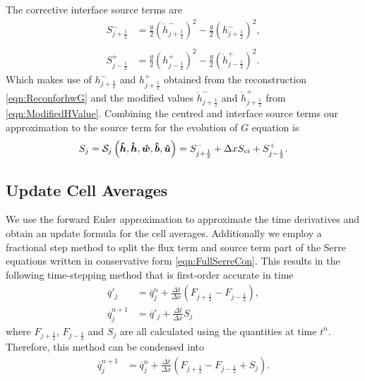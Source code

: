 The corrective interface source terms are
	\begin{align*}
	 S^{-}_{j + \frac{1}{2}} &=  \frac{g}{2} \left(\grave{h}^{-}_{j + \frac{1}{2}} \right)^2 - \frac{g}{2} \left(h^{-}_{j + \frac{1}{2}} \right)^2, \\ \\
	  S^{+}_{j - \frac{1}{2}} &=  \frac{g}{2} \left(h^{+}_{j - \frac{1}{2}}\right)^2 - \frac{g}{2}\left(\grave{h}^{+}_{j - \frac{1}{2}}\right)^2 .	 
	\end{align*}
Which makes use of $h^{-}_{j + \frac{1}{2}}$ and $h^{+}_{j + \frac{1}{2}}$ obtained from the reconstruction \eqref{eqn:ReconforhwG} and the modified values $\grave{h}^{-}_{j + \frac{1}{2}}$ and $\grave{h}^{+}_{j + \frac{1}{2}}$ from \eqref{eqn:ModifiedHValue}. Combining the centred and interface source terms our approximation to the source term for the evolution of $G$ equation is
\begin{equation}
S_j = \mathcal{S}_j\left( \boldsymbol{\hat{h}},\boldsymbol{\grave{h}},\boldsymbol{\hat{w}},\boldsymbol{\hat{b}}, \boldsymbol{\hat{u}}  \right) =  S^{-}_{j + \frac{1}{2}} + \Delta x S_{ci} + S^{+}_{j - \frac{1}{2}}.
\label{eqn:SourceTerm}
\end{equation}


\subsection{Update Cell Averages}
We use the forward Euler approximation to approximate the time derivatives and obtain an update formula for the cell averages. Additionally we employ a fractional step method to split the flux term and source term part of the Serre equations written in conservative form \eqref{eqn:FullSerreCon}. This results in the following time-stepping method that is first-order accurate in time
\begin{align*}
\overline{q}'_j &= \overline{q}^{n}_j + \frac{\Delta t}{\Delta x} \left(F_{j+\frac{1}{2}} - F_{j-\frac{1}{2}}\right), \\
\overline{q}^{n+1}_j &= \overline{q}'_j + \frac{\Delta t}{\Delta x} S_j
\end{align*}
where $F_{j+\frac{1}{2}}$, $F_{j-\frac{1}{2}}$ and $S_j$ are all calculated using the quantities at time $t^n$. Therefore, this method can be condensed into
\begin{align}
\overline{q}^{n+1}_j &= \overline{q}^{n}_j + \frac{\Delta t}{\Delta x} \left(F_{j+\frac{1}{2}} - F_{j-\frac{1}{2}} + S_j\right).
\label{eqn:UpdateMethod}
\end{align}

